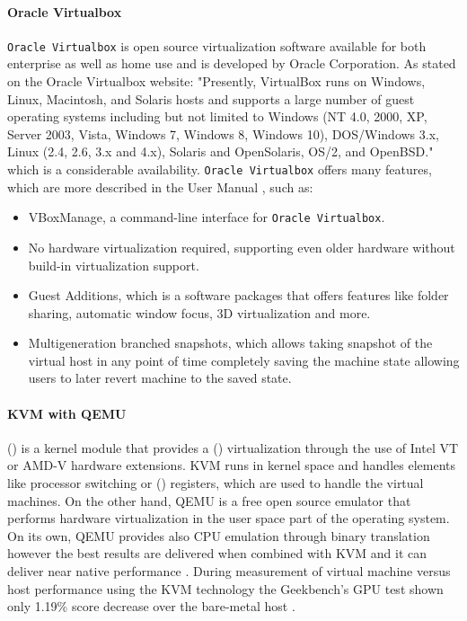 \paragraph{Oracle Virtualbox}
\texttt{Oracle Virtualbox} is open source virtualization software available for both enterprise as well as home use and is developed by Oracle Corporation. As stated on the Oracle Virtualbox website: "Presently, VirtualBox runs on Windows, Linux, Macintosh, and Solaris hosts and supports a large number of guest operating systems including but not limited to Windows (NT 4.0, 2000, XP, Server 2003, Vista, Windows 7, Windows 8, Windows 10), DOS/Windows 3.x, Linux (2.4, 2.6, 3.x and 4.x), Solaris and OpenSolaris, OS/2, and OpenBSD." \cite{oraclehome} which is a considerable availability. \texttt{Oracle Virtualbox} offers many features, which are more described in the User Manual \cite{oracledatasheet}, such as:
\begin{itemize}
	\item VBoxManage, a command-line interface for \texttt{Oracle Virtualbox}.
	\item No hardware virtualization required, supporting even older hardware without build-in virtualization support. 
	\item Guest Additions, which is a software packages that offers features like folder sharing, automatic window focus, 3D virtualization and more.
	\item Multigeneration branched snapshots, which allows taking snapshot of the virtual host in any point of time completely saving the machine state allowing users to later revert machine to the saved state.
\end{itemize}
\paragraph{KVM with QEMU}
 () is a kernel module that provides a  () virtualization through the use of Intel VT or AMD-V hardware extensions. KVM runs in kernel space and handles elements like processor switching or  () registers, which are used to handle the virtual machines. On the other hand, QEMU is a free open source emulator that performs hardware virtualization in the user space part of the operating system. On its own, QEMU provides also CPU emulation through binary translation however the best results are delivered when combined with KVM and it can deliver near native performance \cite{kvmspeed}. During measurement of virtual machine versus host performance using the KVM technology the Geekbench’s GPU test shown only 1.19\% score decrease over the bare-metal host \cite{kvmbenchmark}.
